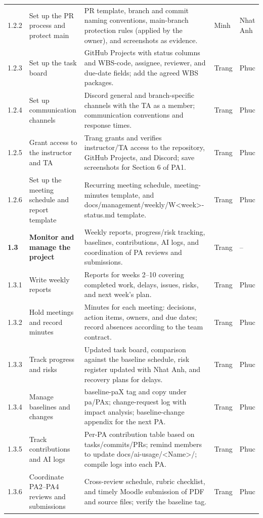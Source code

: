\documentclass[11pt]{article}
\renewcommand{\arraystretch}{1.18}
\begin{document}
\begin{longtable}{@{}L{1.15cm}L{3.2cm}L{7.6cm}L{1.4cm}L{1.4cm}@{}}
1.2.2 & Set up the PR process and protect main & PR template, branch and commit naming conventions, main-branch protection rules (applied by the owner), and screenshots as evidence. & Minh & Nhat Anh \\
1.2.3 & Set up the task board & GitHub Projects with status columns and WBS-code, assignee, reviewer, and due-date fields; add the agreed WBS packages. & Trang & Phuc \\
1.2.4 & Set up communication channels & Discord general and branch-specific channels with the TA as a member; communication conventions and response times. & Trang & Phuc \\
1.2.5 & Grant access to the instructor and TA & Trang grants and verifies instructor/TA access to the repository, GitHub Projects, and Discord; save screenshots for Section 6 of PA1. & Trang & Phuc \\
1.2.6 & Set up the meeting schedule and report template & Recurring meeting schedule, meeting-minutes template, and docs/management/weekly/W\textless{}week\textgreater{}-status.md template. & Trang & Phuc \\
\textbf{1.3} & \textbf{Monitor and manage the project} & Weekly reports, progress/risk tracking, baselines, contributions, AI logs, and coordination of PA reviews and submissions. & Trang & -- \\
1.3.1 & Write weekly reports & Reports for weeks 2--10 covering completed work, delays, issues, risks, and next week's plan. & Trang & Phuc \\
1.3.2 & Hold meetings and record minutes & Minutes for each meeting: decisions, action items, owners, and due dates; record absences according to the team contract. & Trang & Phuc \\
1.3.3 & Track progress and risks & Updated task board, comparison against the baseline schedule, risk register updated with Nhat Anh, and recovery plans for delays. & Trang & Phuc \\
1.3.4 & Manage baselines and changes & baseline-paX tag and copy under pa/PAx; change-request log with impact analysis; baseline-change appendix for the next PA. & Trang & Phuc \\
1.3.5 & Track contributions and AI logs & Per-PA contribution table based on tasks/commits/PRs; remind members to update docs/ai-usage/\textless{}Name\textgreater{}/; compile logs into each PA. & Trang & Phuc \\
1.3.6 & Coordinate PA2--PA4 reviews and submissions & Cross-review schedule, rubric checklist, and timely Moodle submission of PDF and source files; verify the baseline tag. & Trang & Phuc \\
\bottomrule\end{longtable}\normalsize\setlength{\tabcolsep}{3pt}\renewcommand{\arraystretch}{1.18}
\end{document}
